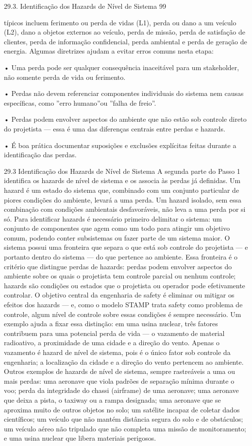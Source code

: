 29.3. Identificação dos Hazards de Nível de Sistema 99

típicos incluem ferimento ou perda de vidas (L1), perda ou dano a um veículo (L2), dano a objetos externos ao veículo, perda de missão, perda de satisfação de clientes, perda de informação confidencial, perda ambiental e perda de geração de energia. Algumas diretrizes ajudam a evitar erros comuns nesta etapa:

• Uma perda pode ser qualquer consequência inaceitável para um stakeholder, não somente perda de vida ou ferimento.

• Perdas não devem referenciar componentes individuais do sistema nem causas específicas, como ”erro humano”ou ”falha de freio”.

• Perdas podem envolver aspectos do ambiente que não estão sob controle direto do projetista — essa é uma das diferenças centrais entre perdas e hazards.

• É boa prática documentar suposições e exclusões explícitas feitas durante a identificação das perdas.

29.3 Identificação dos Hazards de Nível de Sistema A segunda parte do Passo 1 identifica os hazards de nível de sistema e os associa às perdas já definidas. Um hazard é um estado do sistema que, combinado com um conjunto particular de piores condições do ambiente, levará a uma perda. Um hazard isolado, sem essa combinação com condições ambientais desfavoráveis, não leva a uma perda por si só. Para identificar hazards é necessário primeiro delimitar o sistema: um conjunto de componentes que agem como um todo para atingir um objetivo comum, podendo conter subsistemas ou fazer parte de um sistema maior. O sistema possui uma fronteira que separa o que está sob controle do projetista — e portanto dentro do sistema — do que pertence ao ambiente. Essa fronteira é o critério que distingue perdas de hazards: perdas podem envolver aspectos do ambiente sobre os quais o projetista tem controle parcial ou nenhum controle; hazards são condições ou estados que o projetista ou operador pode efetivamente controlar. O objetivo central da engenharia de safety é eliminar ou mitigar os efeitos dos hazards — e, como o modelo STAMP trata safety como problema de controle, algum nível de controle sobre essas condições é sempre necessário. Um exemplo ajuda a fixar essa distinção: em uma usina nuclear, três fatores contribuem para uma potencial perda de vida — o vazamento de material radioativo, a proximidade de uma cidade e a direção do vento. Apenas o vazamento é hazard de nível de sistema, pois é o único fator sob controle da engenharia; a localização da cidade e a direção do vento pertencem ao ambiente. Outros exemplos de hazards de nível de sistema, sempre rastreáveis a uma ou mais perdas: uma aeronave que viola padrões de separação mínima durante o voo; perda da integridade do chassi (airframe) de uma aeronave; uma aeronave que deixa a pista, o taxiway ou a rampa designada; uma aeronave que se aproxima muito de outros objetos no solo; um satélite incapaz de coletar dados científicos; um veículo que não mantém distância segura do solo e de obstáculos; um veículo aéreo não tripulado que não completa uma missão de monitoramento; e uma usina nuclear que libera materiais perigosos.

